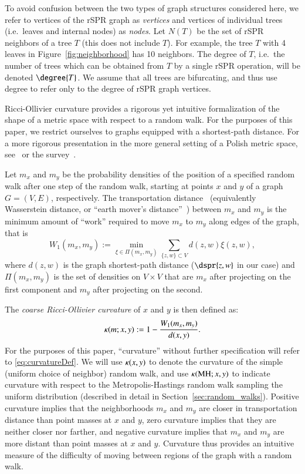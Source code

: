 \documentclass[]{elsarticle}
\newcommand{\MH}{\operatorname{MH}}
\newcommand{\curvature}[2][]{%
    \ifthenelse{\equal{#1}{}}%
		{\kappa(#2)}%
		{\kappa_{#1}(#2)}%
}
\begin{document}
To avoid confusion between the two types of graph structures considered here, we refer to vertices of the rSPR graph as \emph{vertices} and vertices of individual trees (i.e.\ leaves and internal nodes) as \emph{nodes}.
Let $N(T)$ be the set of rSPR neighbors of a tree $T$ (this does not include $T$).
For example, the tree $T$ with 4 leaves in Figure~\ref{fig:neighborhood} has 10 neighbors.
The degree of $T$, i.e.\ the number of trees which can be obtained from $T$ by a single rSPR operation, will be denoted $\degree{T}$.
We assume that all trees are bifurcating, and thus use degree to refer only to the degree of rSPR graph vertices.

Ricci-Ollivier curvature provides a rigorous yet intuitive formalization of the shape of a metric space with respect to a random walk.
For the purposes of this paper, we restrict ourselves to graphs equipped with a shortest-path distance.
For a more rigorous presentation in the more general setting of a Polish metric space, see~\citep{Ollivier2009-bw} or the survey~\citep{Ollivier2010-ao}.

Let $m_x$ and $m_y$ be the probability densities of the position of a specified random walk after one step of the random walk, starting at points $x$ and $y$ of a graph $G = (V,E)$, respectively.
The transportation distance~\citep{Villani2003-wv} (equivalently Wasserstein distance, or ``earth mover's distance''~\citep{rubner2000earth}) between $m_x$ and $m_y$ is the minimum amount of ``work'' required to move $m_x$ to $m_y$ along edges of the graph, that is
\vspace{-0.5em}
\begin{equation}
W_1(m_x, m_y) := \min_{\xi \in \Pi(m_x, m_y)} \sum_{\{z,w\} \subset V} d(z,w) \xi(z,w),
\end{equation}
where $d(z,w)$ is the graph shortest-path distance ($\dspr{z,w}$ in our case) and $\Pi(m_x, m_y)$ is the set of densities on $V \times V$ that are $m_x$ after projecting on the first component and $m_y$ after projecting on the second.

The \emph{coarse Ricci-Ollivier curvature} of $x$ and $y$ is then defined as:
\vspace{-0.5em}
\begin{equation}
\curvature{m; x, y} := 1 - \frac{W_1(m_x, m_y)}{d(x, y)}.
\label{eq:curvatureDef}
\end{equation}
For the purposes of this paper, ``curvature'' without further specification will refer to \eqref{eq:curvatureDef}.
We will use $\curvature{x,y}$ to denote the curvature of the simple (uniform choice of neighbor) random walk, and use $\curvature{\MH; x,y}$ to indicate curvature with respect to the Metropolis-Hastings random walk sampling the uniform distribution (described in detail in Section~\ref{sec:random_walks}).
Positive curvature implies that the neighborhoods $m_x$ and $m_y$ are closer in transportation distance than point masses at $x$ and $y$, zero curvature implies that they are neither closer nor farther, and negative curvature implies that $m_x$ and $m_y$ are more distant than point masses at $x$ and $y$.
Curvature thus provides an intuitive measure of the difficulty of moving between regions of the graph with a random walk.
\end{document}
